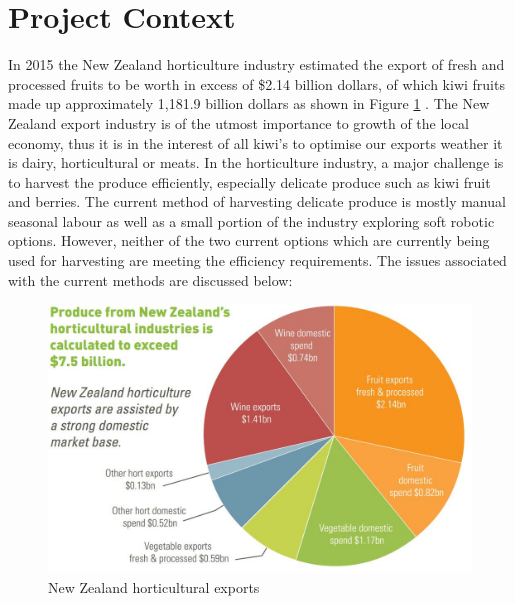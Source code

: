 \documentclass[11pt]{article}
\begin{document}
\section{Project Context}
In 2015 the New Zealand horticulture industry estimated the export of fresh and processed fruits to be worth in excess of \$2.14 billion dollars, of which kiwi fruits made up approximately 1,181.9 billion dollars as shown in Figure \ref{fig:Pie} \cite{fresh_facts_2015}. The New Zealand export industry is of the utmost importance to growth of the local economy, thus it is in the interest of all kiwi's to optimise our exports weather it is dairy, horticultural or meats. In the horticulture industry, a major challenge is to harvest the produce efficiently, especially delicate produce such as kiwi fruit and berries. The current method of harvesting delicate produce is mostly manual seasonal labour as well as a small portion of the industry exploring soft robotic options. However, neither of the two current options which are currently being used for harvesting are meeting the efficiency requirements. The issues associated with the current methods are discussed below:
\begin{figure}[h]
\centering
\includegraphics[scale=0.45]{pie_imports}
\caption{New Zealand horticultural exports}
\label{fig:Pie}
\end{figure}
\end{document}
